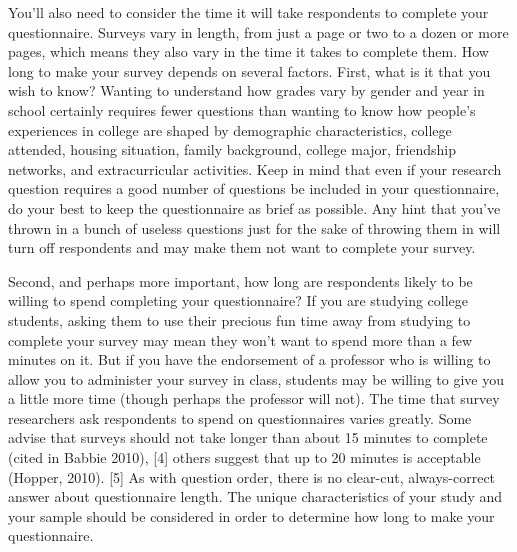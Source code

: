 You’ll also need to consider the time it will take respondents to complete your questionnaire. Surveys vary in length, from just a page or two to a dozen or more pages, which means they also vary in the time it takes to complete them. How long to make your survey depends on several factors. First, what is it that you wish to know? Wanting to understand how grades vary by gender and year in school certainly requires fewer questions than wanting to know how people’s experiences in college are shaped by demographic characteristics, college attended, housing situation, family background, college major, friendship networks, and extracurricular activities. Keep in mind that even if your research question requires a good number of questions be included in your questionnaire, do your best to keep the questionnaire as brief as possible. Any hint that you’ve thrown in a bunch of useless questions just for the sake of throwing them in will turn off respondents and may make them not want to complete your survey.

Second, and perhaps more important, how long are respondents likely to be willing to spend completing your questionnaire? If you are studying college students, asking them to use their precious fun time away from studying to complete your survey may mean they won’t want to spend more than a few minutes on it. But if you have the endorsement of a professor who is willing to allow you to administer your survey in class, students may be willing to give you a little more time (though perhaps the professor will not). The time that survey researchers ask respondents to spend on questionnaires varies greatly. Some advise that surveys should not take longer than about 15 minutes to complete (cited in Babbie 2010), [4] others suggest that up to 20 minutes is acceptable (Hopper, 2010). [5] As with question order, there is no clear-cut, always-correct answer about questionnaire length. The unique characteristics of your study and your sample should be considered in order to determine how long to make your questionnaire.

